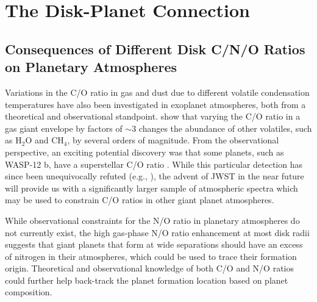 %
%
%
%
%

\section{The Disk-Planet Connection}

\subsection{Consequences of Different Disk C/N/O Ratios on Planetary Atmospheres}

Variations in the C/O ratio in gas and dust due to different volatile condensation temperatures have also been investigated in exoplanet atmospheres, both from a theoretical and observational standpoint. \citet{molliere15} show that varying the C/O ratio in a gas giant envelope by factors of $\sim$3 changes the abundance of other volatiles, such as H$_2$O and CH$_4$, by several orders of magnitude. From the observational perspective, an exciting potential discovery was that some planets, such as WASP-12 b, have a superstellar C/O ratio \citep{madhu11}. While this particular detection has since been unequivocally refuted (e.g., \citealt{kreidberg15}), the advent of JWST in the near future will provide us with a significantly larger sample of atmospheric spectra which may be used to constrain C/O ratios in other giant planet atmospheres. 

While observational constraints for the N/O ratio in planetary atmospheres do not currently exist, the high gas-phase N/O ratio enhancement at most disk radii suggests that giant planets that form at wide separations should have an excess of nitrogen in their atmospheres, which could be used to trace their formation origin. Theoretical and observational knowledge of both C/O and N/O ratios could further help back-track the planet formation location based on planet composition. 



